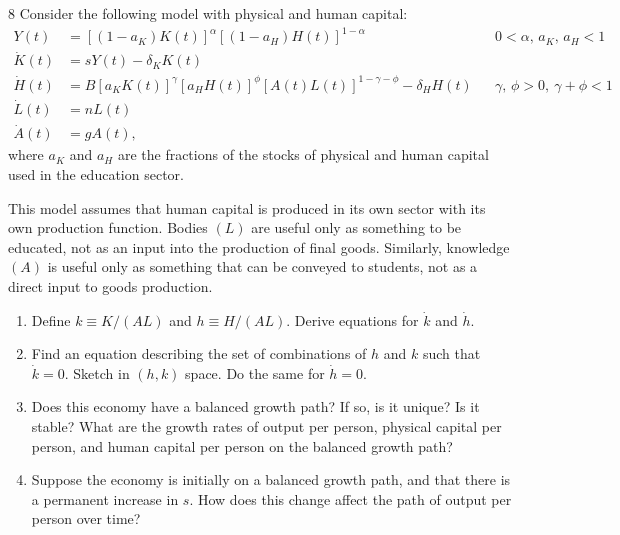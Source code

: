 \begin{problem}{8}
Consider the following model with physical and human capital:
\begin{align*}
Y\left(t\right)
&=
\left[\left(1-a_K\right)K\left(t\right)\right]^\alpha
\left[\left(1-a_H\right)H\left(t\right)\right]^{1-\alpha} && 0<\alpha,\,a_K,\,a_H<1\\
\dot{K}\left(t\right)
&=
sY\left(t\right)-\delta_KK\left(t\right)\\
\dot{H}\left(t\right)
&=
B\left[a_KK\left(t\right)\right]^\gamma
\left[a_HH\left(t\right)\right]^\phi
\left[A\left(t\right)L\left(t\right)\right]^{1-\gamma-\phi}
-\delta_HH\left(t\right) && \gamma,\,\phi>0, \ \gamma+\phi<1\\
\dot{L}\left(t\right)
&=
nL\left(t\right)\\
\dot{A}\left(t\right)
&=
gA\left(t\right),
\end{align*}
where \(a_K\) and \(a_H\) are the fractions of the stocks of physical and human capital used in the education sector.

This model assumes that human capital is produced in its own sector with its own production function. Bodies \(\left(L\right)\) are useful only as something to be educated, not as an input into the production of final goods. Similarly, knowledge \(\left(A\right)\) is useful only as something that can be conveyed to students, not as a direct input to goods production.
\begin{enumerate}[label=(\alph*)]
    \item Define \(k\equiv K/\left(AL\right)\) and \(h\equiv H/\left(AL\right)\). Derive equations for \(\dot{k}\) and \(\dot{h}\).
    \item Find an equation describing the set of combinations of \(h\) and \(k\) such that \(\dot{k}=0\). Sketch in \(\left(h,k\right)\) space. Do the same for \(\dot{h}=0\).
    \item Does this economy have a balanced growth path? If so, is it unique? Is it stable? What are the growth rates of output per person, physical capital per person, and human capital per person on the balanced growth path?
    \item Suppose the economy is initially on a balanced growth path, and that there is a permanent increase in \(s\). How does this change affect the path of output per person over time?
\end{enumerate}
\end{problem}

